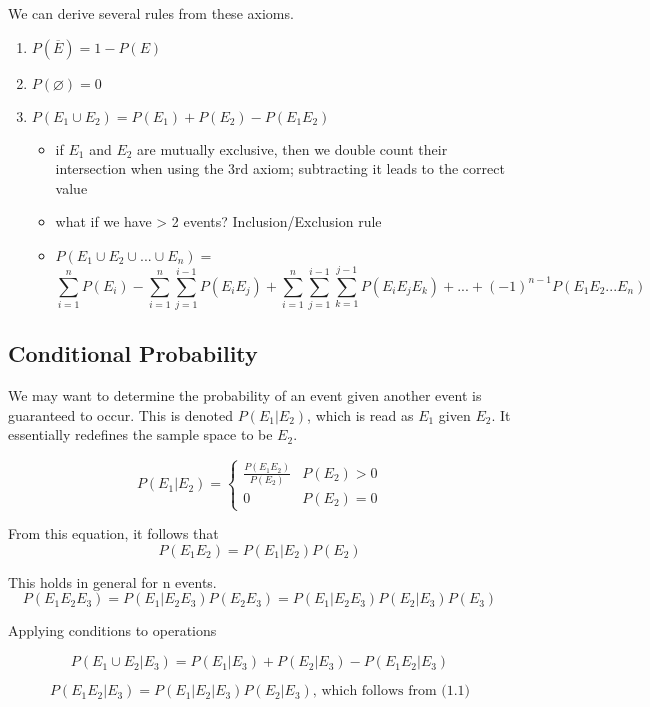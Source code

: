 We can derive several rules from these axioms.
\begin{enumerate}
    \item $P(\overline{E}) = 1 - P(E)$
    \item $P(\varnothing) = 0$
    \item $P(E_1 \cup E_2) = P(E_1) + P(E_2) - P(E_1E_2)$
    \begin{itemize}
        \item if $E_1$ and $E_2$ are mutually exclusive, then we double count their intersection when using the 3rd axiom; subtracting it leads to the correct value
        \item what if we have > 2 events? Inclusion/Exclusion rule 
        \item $P(E_1 \cup E_2 \cup ... \cup E_n) =$ \[
             \sum_{i=1}^{n}P(E_i) - \sum_{i=1}^{n}\sum_{j=1}^{i-1}P(E_iE_j) + \sum_{i=1}^{n}\sum_{j=1}^{i-1}\sum_{k=1}^{j-1}P(E_iE_jE_k) + ... + (-1)^{n-1}P(E_1E_2...E_n)
            \]
    \end{itemize}
\end{enumerate}

\pagebreak

\subsection*{Conditional Probability}
We may want to determine the probability of an event given another event is guaranteed to occur. This is denoted $P(E_1 | E_2)$, which is read as $E_1$ given $E_2$. It essentially redefines the sample space to be $E_2$.


\begin{equation}
    P(E_1 | E_2) = \begin{cases}
        \frac{P(E_1E_2)}{P(E_2)} & P(E_2) > 0 \\
        0 & P(E_2) = 0
    \end{cases}
\end{equation}

From this equation, it follows that
\[
    P(E_1E_2) = P(E_1 | E_2)P(E_2)
\]

This holds in general for n events.
\[
    P(E_1E_2E_3) = P(E_1 | E_2E_3)P(E_2E_3)
                 = P(E_1 | E_2E_3)P(E_ 2 | E_3)P(E_3)
\]

\begin{example}
    Applying conditions to operations

    \[
        P(E_1 \cup E_2 | E_3)  = P(E_1 | E_3) + P(E_2 | E_3) - P(E_1E_2 | E_3)
    \]

    \[
        P(E_1E_2 | E_3)  = P(E_1|E_2|E_3)P(E_2|E_3) \text{, which follows from (1.1)}
    \]
\end{example}

